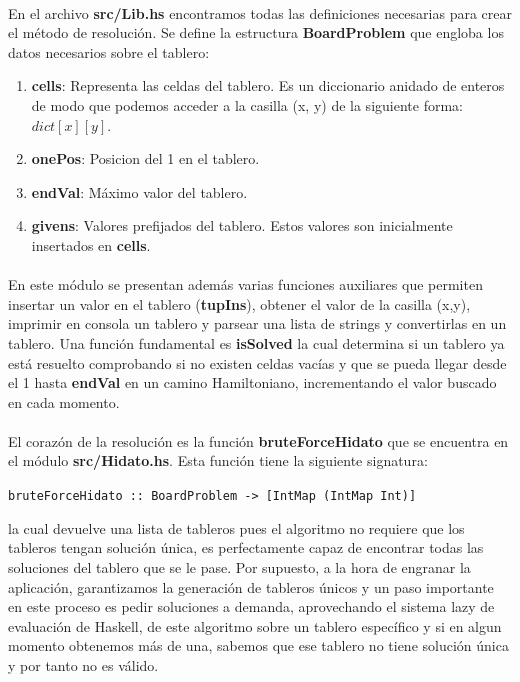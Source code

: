 \documentclass[a4paper, 12pt]{article}
\begin{document}
\paragraph{}
En el archivo \textbf{src/Lib.hs} encontramos todas las definiciones necesarias para crear el m\'etodo
de resoluci\'on. Se define la estructura \textbf{BoardProblem} que engloba los datos necesarios sobre el
tablero:

\begin{enumerate}
   \item \textbf{cells}: Representa las celdas del tablero. Es un diccionario anidado de enteros de modo
         que podemos acceder a la casilla (x, y) de la siguiente forma: $dict[x][y]$.
   \item \textbf{onePos}: Posicion del 1 en el tablero.
   \item \textbf{endVal}: M\'aximo valor del tablero.
   \item \textbf{givens}: Valores prefijados del tablero. Estos valores son inicialmente insertados en \textbf{cells}.
\end{enumerate}

\paragraph{}
En este m\'odulo se presentan adem\'as varias funciones auxiliares que permiten insertar un valor en el tablero (\textbf{tupIns}),
obtener el valor de la casilla (x,y), imprimir en consola un tablero y parsear una lista de strings y convertirlas en un tablero.
Una funci\'on fundamental es \textbf{isSolved} la cual determina si un tablero ya est\'a resuelto comprobando si no existen celdas
vac\'ias y que se pueda llegar desde el 1 hasta \textbf{endVal} en un camino Hamiltoniano, incrementando el valor buscado en cada momento.

\paragraph{}
El coraz\'on de la resoluci\'on es la funci\'on \textbf{bruteForceHidato} que se encuentra en el m\'odulo
\textbf{src/Hidato.hs}. Esta funci\'on tiene la siguiente signatura:

\texttt{bruteForceHidato :: BoardProblem -> [IntMap (IntMap Int)]}

la cual devuelve una lista de tableros pues el algoritmo no requiere que los tableros tengan soluci\'on \'unica, es perfectamente
capaz de encontrar todas las soluciones del tablero que se le pase. Por supuesto, a la hora de engranar la aplicaci\'on, garantizamos
la generaci\'on de tableros \'unicos y un paso importante en este proceso es pedir soluciones a demanda, aprovechando el sistema lazy de evaluaci\'on
de Haskell, de este algoritmo sobre un tablero
espec\'ifico y si en algun momento obtenemos m\'as de una, sabemos que ese tablero no tiene soluci\'on \'unica y por tanto no es v\'alido.
\end{document}
